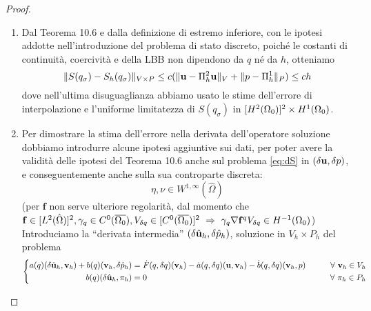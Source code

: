 \begin{proof}\
	\begin{enumerate}
	\item Dal Teorema 10.6 \cite{Quarteroni2008} e dalla definizione di estremo inferiore, con le ipotesi addotte nell'introduzione del problema di stato discreto, poiché le costanti di continuità, coercività e della LBB non dipendono da $q$ né da $h$, otteniamo
	$$\|S(q_\sigma)-S_h(q_\sigma)\|_{V\times P} \leq c(\|\mathbf{u}-\Pi^2_h\mathbf{u}\|_V+\|p-\Pi^1_h\|_P) \leq ch$$
	dove nell'ultima disuguaglianza abbiamo usato le stime dell'errore di interpolazione e l'uniforme limitatezza di $S(q_\sigma)$ in $[H^2({\Omega_0})]^2\times H^1({\Omega_0})$.\\

	\item Per dimostrare la stima dell'errore nella derivata dell'operatore soluzione dobbiamo introdurre alcune ipotesi aggiuntive sui dati, per poter avere la validità delle ipotesi del Teorema 10.6 \cite{Quarteroni2008} anche sul problema \eqref{eq:dS} in $(\mathbf{\delta u},\delta p)$, e conseguentemente anche sulla sua controparte discreta:
	$$ \eta,\nu\in W^{1,\infty}(\hat{\Omega})$$
	(per $\mathbf f$ non serve ulteriore regolarità, dal momento che $\mathbf f \in[L^2(\hat{\Omega})]^2,\gamma_q\in C^0(\overline{\O}),V_\dq\in [C^0(\overline{\O})]^2\ \Rightarrow\ \gamma_q\nabla\mathbf f^q V_\dq\in H^{-1}(\O)$)\\
	Introduciamo la ``derivata intermedia'' $(\delta\hat{\mathbf{u}}_h,\delta\hat{p}_h)$, soluzione in $V_h\times P_h$ del problema
	\begin{equation}
		\left\{
		\begin{aligned}
		a(q)(\delta\hat{\mathbf{u}}_h,\mathbf{v}_h) + b(q)(\mathbf{v}_h,\delta\hat{p}_h) &= \dot{F}(q,{\delta q})(\mathbf{v}_h) - \dot{a}(q,{\delta q})(\mathbf{u},\mathbf v_h) - \dot{b}(q,{\delta q})(\mathbf v_h, p)\qquad&\forall\ \mathbf{v}_h\in  V_h\\
		b(q)(\delta\hat{\mathbf{u}}_h,\pi_h) &= 0 \qquad&\forall\ \pi_h \in P_h\\
		\end{aligned}\right.\\
	\label{eq:dSinterm}
	\end{equation}

\end{enumerate}
\end{proof}
